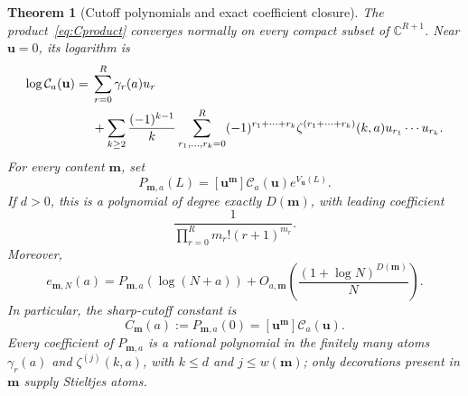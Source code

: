 \documentclass[11pt,oneside]{article}
\numberwithin{equation}{section}
\newtheorem{theorem}{Theorem}[section]
\theoremstyle{definition}
\theoremstyle{remark}
\newcommand{\C}{\mathbb C}
\newcommand{\uu}{\mathbf u}
\newcommand{\mm}{\mathbf m}
\newcommand{\CC}{\mathcal C}
\begin{document}
\begin{theorem}[Cutoff polynomials and exact coefficient closure]
\label{thm:cutoff}
The product~\eqref{eq:Cproduct} converges normally on every compact subset of
$\C^{R+1}$. Near $\uu=0$, its logarithm is
\begin{align}
\log\CC_a(\uu)
={}&\sum_{r=0}^R\gamma_r(a)u_r\notag\\
&+\sum_{k\ge2}\frac{(-1)^{k-1}}{k}
 \sum_{r_1,\ldots,r_k=0}^R
 (-1)^{r_1+\cdots+r_k}\zeta^{(r_1+\cdots+r_k)}(k,a)
 u_{r_1}\cdots u_{r_k}.\label{eq:cumulants}
\end{align}
For every content $\mm$, set
\begin{equation}\label{eq:P}
P_{\mm,a}(L)=[\uu^{\mm}]\CC_a(\uu)e^{V_{\uu}(L)}.
\end{equation}
If $d>0$, this is a polynomial of degree exactly $D(\mm)$, with leading
coefficient
\[
\frac{1}{\prod_{r=0}^R m_r!(r+1)^{m_r}}.
\]
Moreover,
\begin{equation}\label{eq:cutoff-asymptotic}
e_{\mm,N}(a)=P_{\mm,a}(\log(N+a))
 +O_{a,\mm}\!\left(\frac{(1+\log N)^{D(\mm)}}{N}\right).
\end{equation}
In particular, the sharp-cutoff constant is
\begin{equation}\label{eq:Cconstant}
C_{\mm}(a):=P_{\mm,a}(0)=[\uu^{\mm}]\CC_a(\uu).
\end{equation}
Every coefficient of $P_{\mm,a}$ is a rational polynomial in the finitely many
atoms $\gamma_r(a)$ and $\zeta^{(j)}(k,a)$, with $k\le d$ and $j\le w(\mm)$;
only decorations present in $\mm$ supply Stieltjes atoms.
\end{theorem}
\end{document}

